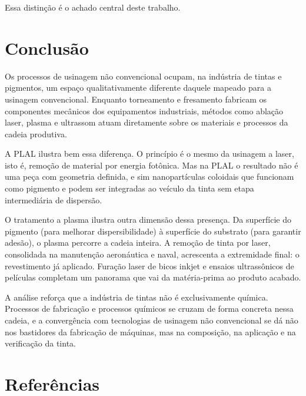 \documentclass[
  12pt,
  a4paper,
  oneside,
  brazil,
  chapter=TITLE
]{article}
\newcommand{\secbreak}{\clearpage}
\let\oldsection\section
\renewcommand{\section}{\secbreak\oldsection}
\begin{document}
Essa distinção é o achado central deste trabalho.

\section{Conclusão}\label{conclusao}

Os processos de usinagem não convencional ocupam, na indústria de tintas e pigmentos, um espaço qualitativamente diferente daquele mapeado para a usinagem convencional. Enquanto torneamento e fresamento fabricam os componentes mecânicos dos equipamentos industriais, métodos como ablação laser, plasma e ultrassom atuam diretamente sobre os materiais e processos da cadeia produtiva.

A PLAL ilustra bem essa diferença. O princípio é o mesmo da usinagem a laser, isto é, remoção de material por energia fotônica. Mas na PLAL o resultado não é uma peça com geometria definida, e sim nanopartículas coloidais que funcionam como pigmento e podem ser integradas ao veículo da tinta sem etapa intermediária de dispersão.

O tratamento a plasma ilustra outra dimensão dessa presença. Da superfície do pigmento (para melhorar dispersibilidade) à superfície do substrato (para garantir adesão), o plasma percorre a cadeia inteira. A remoção de tinta por laser, consolidada na manutenção aeronáutica e naval, acrescenta a extremidade final: o revestimento já aplicado. Furação laser de bicos inkjet e ensaios ultrassônicos de películas completam um panorama que vai da matéria-prima ao produto acabado.

A análise reforça que a indústria de tintas não é exclusivamente química. Processos de fabricação e processos químicos se cruzam de forma concreta nessa cadeia, e a convergência com tecnologias de usinagem não convencional se dá não nos bastidores da fabricação de máquinas, mas na composição, na aplicação e na verificação da tinta.

\section{Referências}\label{referencias}
\end{document}
